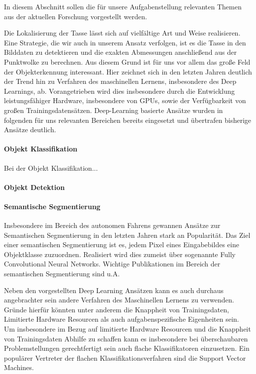 In diesem Abschnitt sollen die für unsere Aufgabenstellung relevanten Themen aus der aktuellen Forschung vorgestellt werden.

Die Lokalisierung der Tasse lässt sich auf vielfältige Art und Weise realisieren. Eine Strategie, die wir auch in unserem Ansatz verfolgen, ist es die Tasse in den Bilddaten zu detektieren und die exakten Abmessungen anschließend aus der Punktwolke zu berechnen. Aus diesem Grund ist für uns vor allem das große Feld der Objekterkennung interessant. Hier zeichnet sich in den letzten Jahren deutlich der Trend hin zu Verfahren des maschinellen Lernens, insbesondere des Deep Learnings, ab. Vorangetrieben wird dies insbesondere durch die Entwicklung leistungsfähiger Hardware, insbesondere von GPUs, sowie der Verfügbarkeit von großen Trainingsdatensätzen. Deep-Learning basierte Ansätze wurden in folgenden für uns relevanten Bereichen bereits eingesetzt und übertrafen bisherige Ansätze deutlich.

\paragraph{Objekt Klassifikation}
Bei der Objekt Klassifikation...

\paragraph{Objekt Detektion}

\paragraph{Semantische Segmentierung}
Insbesondere im Bereich des autonomen Fahrens gewannen Ansätze zur Semantischen Segmentierung in den letzten Jahren stark an Popularität. Das Ziel einer semantischen Segmentierung ist es, jedem Pixel eines Eingabebildes eine Objektklasse zuzuordnen. Realisiert wird dies zumeist über sogenannte Fully Convolutional Neural Networks. Wichtige Publikationen im Bereich der semantischen Segmentierung sind u.A.

Neben den vorgestellten Deep Learning Ansätzen kann es auch durchaus angebrachter sein andere Verfahren des Maschinellen Lernens zu verwenden. Gründe hierfür könnten unter anderem die Knappheit von Trainingsdaten, Limitierte Hardware Resourcen als auch aufgabenspezifische Eigenheiten sein. Um insbesondere im Bezug auf limitierte Hardware Resourcen und die Knappheit von Trainingsdaten Abhilfe zu schaffen kann es insbesondere bei überschaubaren Problemstellungen gerechtfertigt sein auch flache Klassifikatoren einzusetzen. Ein populärer Vertreter der flachen Klassifikationsverfahren sind die Support Vector Machines. 